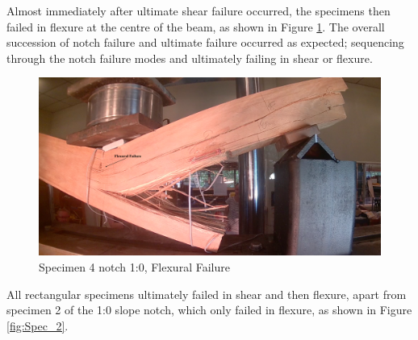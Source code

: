 \documentclass[11pt,a4paper]{article}
\numberwithin{equation}{subsection}
\begin{document}
\noindent
Almost immediately after ultimate shear failure occurred, the specimens then failed in flexure at the centre of the beam, as shown in Figure \ref{fig:Rect_Flex}. The overall succession of notch failure and ultimate failure occurred as expected; sequencing through the notch failure modes and ultimately failing in shear or flexure. 

\begin{figure}[h]
	\begin{center}
		\includegraphics[scale=0.3]{Rect_Flexure}
	\end{center}
	\caption{Specimen 4 notch 1:0, Flexural Failure}
	\label{fig:Rect_Flex}
\end{figure}
\pagebreak

\noindent
All rectangular specimens ultimately failed in shear and then flexure, apart from specimen 2 of the 1:0 slope notch, which only failed in flexure, as shown in Figure \ref{fig:Spec_2}.
\end{document}

